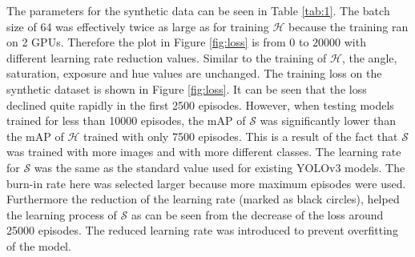 The parameters for the synthetic data can be seen in Table \ref{tab:1}.
The batch size of 64 was effectively twice as large as for training $\mathcal{H}$ because the training ran on 2 GPUs. Therefore the plot in Figure \ref{fig:loss} is from $0$ to $20000$ with different learning rate reduction values.
Similar to the training of $\mathcal{H}$, the angle, saturation, exposure and hue values are unchanged.
The training loss on the synthetic dataset is shown in Figure \ref{fig:loss}.
It can be seen that the loss declined quite rapidly in the first 2500 episodes.
However, when testing models trained for less than 10000 episodes, the mAP of $\mathcal{S}$ was significantly lower than the mAP of $\mathcal{H}$ trained with only 7500 episodes.
This is a result of the fact that $\mathcal{S}$ was trained with more images and with more different classes.
The learning rate for $\mathcal{S}$ was the same as the standard value used for existing YOLOv3 models.
The burn-in rate here was selected larger because more maximum episodes were used.
Furthermore the reduction of the learning rate (marked as black circles), helped the learning process of $\mathcal{S}$ as can be seen from the decrease of the loss around 25000 episodes.
The reduced learning rate was introduced to prevent overfitting of the model.




